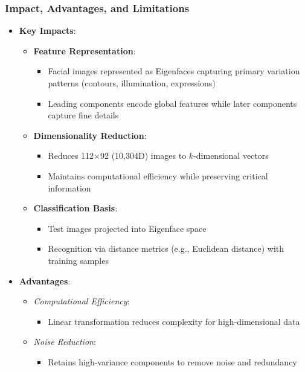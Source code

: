 \documentclass{article}
\begin{document}
	\subsubsection{Impact, Advantages, and Limitations}
	\vspace{-0.2cm}
	\begin{itemize}
		\item \textbf{Key Impacts}:
		\begin{itemize}
			\item \textbf{Feature Representation}: 
			\begin{itemize}
				\item Facial images represented as Eigenfaces capturing primary variation patterns (contours, illumination, expressions)
				\item Leading components encode global features while later components capture fine details
			\end{itemize}
			\item \textbf{Dimensionality Reduction}:
			\begin{itemize}
				\item Reduces 112×92 (10,304D) images to $k$-dimensional vectors
				\item Maintains computational efficiency while preserving critical information
			\end{itemize}
			\item \textbf{Classification Basis}:
			\begin{itemize}
				\item Test images projected into Eigenface space
				\item Recognition via distance metrics (e.g., Euclidean distance) with training samples
			\end{itemize}
		\end{itemize}
		
		\item \textbf{Advantages}:
		\begin{itemize}
			\item \textit{Computational Efficiency}: 
			\begin{itemize}
				\item Linear transformation reduces complexity for high-dimensional data
			\end{itemize}
			\item \textit{Noise Reduction}:
			\begin{itemize}
				\item Retains high-variance components to remove noise and redundancy
			\end{itemize}
		\end{itemize}
		

\end{itemize}
\end{document}
